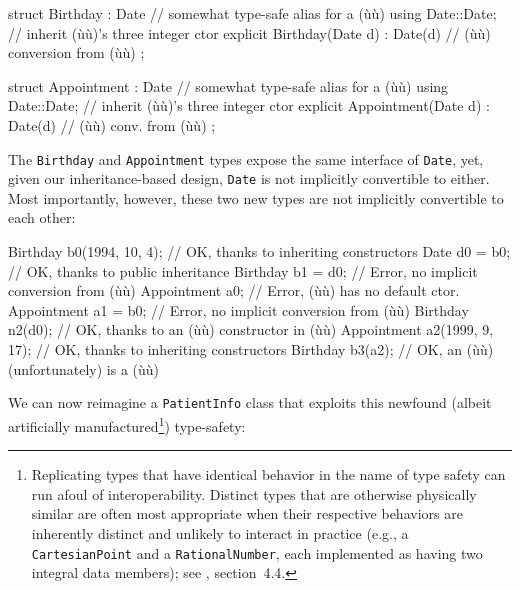 \begin{emcppslisting}[emcppsbatch=e5]
struct Birthday : Date  // somewhat type-safe alias for a (ù{}ù)
{
    using Date::Date;  // inherit (ù{}ù)'s three integer ctor
    explicit Birthday(Date d) : Date(d) { }  // (ù{}ù) conversion from (ù{}ù)
};

struct Appointment : Date  // somewhat type-safe alias for a (ù{}ù)
{
    using Date::Date;  // inherit (ù{}ù)'s three integer ctor
    explicit Appointment(Date d) : Date(d) { }  // (ù{}ù) conv. from (ù{}ù)
};
\end{emcppslisting}
    
\noindent The \lstinline!Birthday! and \lstinline!Appointment! types expose the same
interface of \lstinline!Date!, yet, given our inheritance-based design,
\lstinline!Date! is not implicitly convertible to either. Most importantly,
however, these two new types are not implicitly convertible to each
other:

\begin{emcppslisting}[emcppsbatch=e5]
Birthday b0(1994, 10, 4);  // OK, thanks to inheriting constructors
Date d0 = b0;              // OK, thanks to public inheritance
Birthday b1 = d0;          // Error, no implicit conversion from (ù{}ù)
Appointment a0;            // Error, (ù{}ù) has no default ctor.
Appointment a1 = b0;       // Error, no implicit conversion from (ù{}ù)
Birthday n2(d0);           // OK, thanks to an (ù{}ù) constructor in (ù{}ù)
Appointment a2(1999, 9, 17); // OK, thanks to inheriting constructors           
Birthday    b3(a2);          // OK, an (ù{}ù) (unfortunately) is a (ù{}ù)
\end{emcppslisting}
    
\noindent We can now reimagine a \lstinline!PatientInfo! class that exploits this
newfound (albeit artificially manufactured{\cprotect\footnote{Replicating
types that have identical behavior in the name of type safety can run
afoul of interoperability. Distinct types that are otherwise
physically similar are often most appropriate when their respective
behaviors are inherently distinct and unlikely to interact in practice
(e.g., a \mbox{\lstinline!CartesianPoint!} and a \mbox{\lstinline!RationalNumber!},
each implemented as having two integral data members); see
  \cite{lakos2a}, section~4.4.}}) type-safety:

